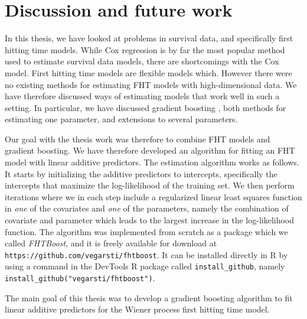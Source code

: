 \chapter{Discussion and future work}
\label{sec:discussion}
In this thesis, we have looked at problems in survival data, and specifically first hitting time models.
While Cox regression is by far the most popular method used to estimate survival data models, there are shortcomings with the Cox model.
First hitting time models are flexible models which.
However there were no existing methods for estimating FHT models with high-dimensional data.
We have therefore discussed ways of estimating models that work well in such a setting.
In particular, we have discussed gradient boosting \citep{friedman2001}, both methods for estimating one parameter, and extensions to several parameters.

Our goal with the thesis work was therefore to combine FHT models and gradient boosting.
We have therefore developed an algorithm for fitting an FHT model with linear additive predictors.
The estimation algorithm works as follows.
It starts by initializing the additive predictors to intercepts, specifically the intercepts that maximize the log-likelihood of the training set.
We then perform iterations where we in each step include a regularized linear least squares function in \textit{one} of the covariates and \textit{one} of the parameters, namely the combination of covariate and parameter which leads to the largest increase in the log-likelihood function.
The algorithm was implemented from scratch as a package which we called \textit{FHTBoost}, and it is freely available for download at \verb|https://github.com/vegarsti/fhtboost|.
It can be installed directly in R by using a command in the DevTools R package \citep{devtools} called \verb|install_github|, namely \verb|install_github("vegarsti/fhtboost")|.

The main goal of this thesis was to develop a gradient boosting algorithm to fit linear additive predictors for the Wiener process first hitting time model.

